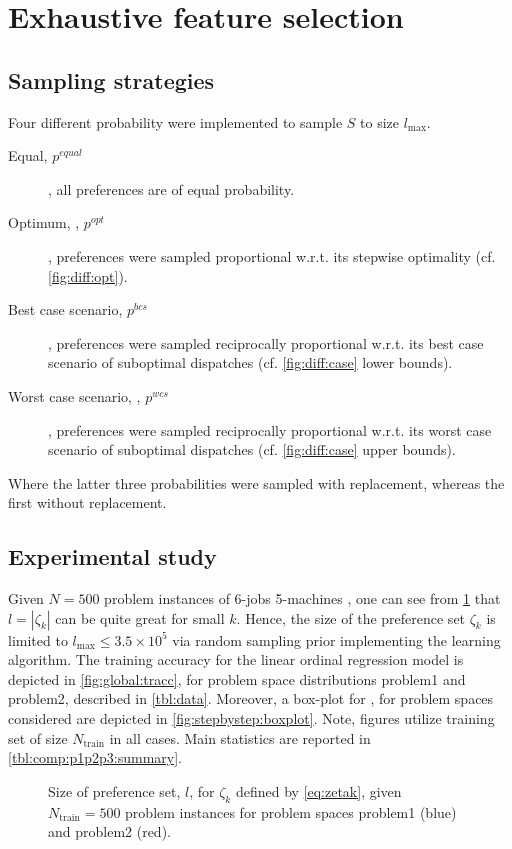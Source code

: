 \section{Exhaustive feature selection}

\subsection{Sampling strategies}
Four different probability were implemented to sample $S$ to size $l_{\max}$. 
\begin{description}
	\item[Equal, $p^{equal}$], all preferences are of equal probability.
	\item[Optimum, , $p^{opt}$], preferences were sampled proportional w.r.t. its stepwise optimality (cf. \cref{fig:diff:opt}).
	\item[Best case scenario, $p^{bcs}$], preferences were sampled reciprocally proportional w.r.t. its best case scenario of suboptimal dispatches (cf. \cref{fig:diff:case} lower bounds).
	\item[Worst case scenario, , $p^{wcs}$], preferences were sampled reciprocally proportional w.r.t. its worst case scenario of suboptimal dispatches (cf. \cref{fig:diff:case} upper bounds).
\end{description}
Where the latter three probabilities were sampled with replacement, whereas the first without replacement.


\subsection{Experimental study}\label{sec:global}
Given $N=500$ problem instances of 6-jobs 5-machines \jsp, one can see from \cref{fig:global:sizeofprefset} that $l=|\zeta_k|$ can be quite great for small $k$. Hence, the size of the preference set $\zeta_k$ is limited to $l_{\max}\leq 3.5\times10^{5}$ via random sampling prior implementing the learning algorithm. The training accuracy for the linear ordinal regression model is depicted in \cref{fig:global:tracc}, for problem space distributions problem{1} and problem{2}, described in \cref{tbl:data}.
Moreover, a box-plot for \fullnamerho, for problem spaces considered are depicted in  \cref{fig:stepbystep:boxplot}. Note, figures utilize training set of size $N_{\text{train}}$ in all cases. Main statistics are reported in \cref{tbl:comp:p1p2p3:summary}. 

\begin{figure}\centering 
	\caption{Size of preference set, $l$, for $\zeta_k$ defined by \cref{eq:zetak}, given $N_{\text{train}}=500$ problem instances for problem spaces problem{1} (blue) and problem{2} (red).}
	\label{fig:global:sizeofprefset}
\end{figure}

